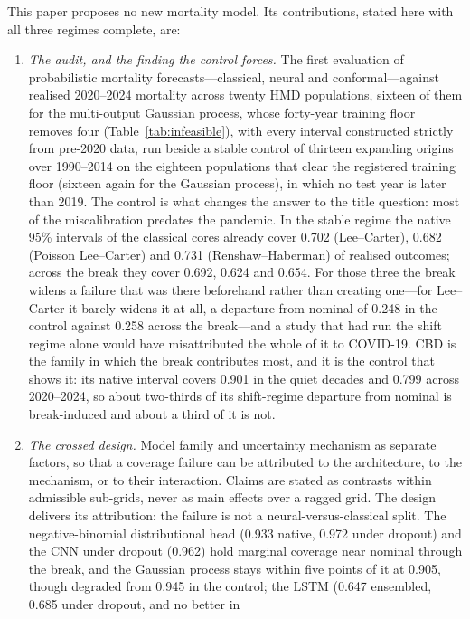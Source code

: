 This paper proposes no new mortality model. Its contributions, stated here
with all three regimes complete, are:
\begin{enumerate}
\item \emph{The audit, and the finding the control forces.} The first
  evaluation of probabilistic mortality forecasts---classical, neural and
  conformal---against realised 2020--2024 mortality across twenty HMD
  populations, sixteen of them for the multi-output Gaussian process, whose
  forty-year training floor removes four (Table~\ref{tab:infeasible}), with
  every interval constructed strictly from pre-2020 data, run beside a
  stable control of thirteen expanding origins over 1990--2014 on the
  eighteen populations that clear the registered training floor (sixteen
  again for the Gaussian process), in which no test year is later than 2019.
  The control is what changes the answer to the title question: most of the
  miscalibration predates the pandemic. In the stable regime the native
  95\% intervals of the classical cores already cover 0.702 (Lee--Carter),
  0.682 (Poisson Lee--Carter) and 0.731 (Renshaw--Haberman) of realised
  outcomes; across the break they cover 0.692, 0.624 and 0.654. For those
  three the break widens a failure that was there beforehand rather than
  creating one---for Lee--Carter it barely widens it at all, a departure
  from nominal of 0.248 in the control against 0.258 across the break---and
  a study that had run the shift regime alone would have misattributed the
  whole of it to COVID-19. CBD is the family in which the break contributes
  most, and it is the control that shows it: its native interval covers
  0.901 in the quiet decades and 0.799 across 2020--2024, so about
  two-thirds of its shift-regime departure from nominal is break-induced and
  about a third of it is not.
\item \emph{The crossed design.} Model family and uncertainty mechanism as
  separate factors, so that a coverage failure can be attributed to the
  architecture, to the mechanism, or to their interaction. Claims are stated
  as contrasts within admissible sub-grids, never as main effects over a
  ragged grid. The design delivers its attribution: the failure is not a
  neural-versus-classical split. The negative-binomial distributional head
  (0.933 native, 0.972 under dropout) and the CNN under dropout (0.962) hold
  marginal coverage near nominal through the break, and the Gaussian process
  stays within five points of it at 0.905, though degraded from 0.945 in the
  control; the LSTM (0.647 ensembled, 0.685 under dropout, and no better in

\end{enumerate}
